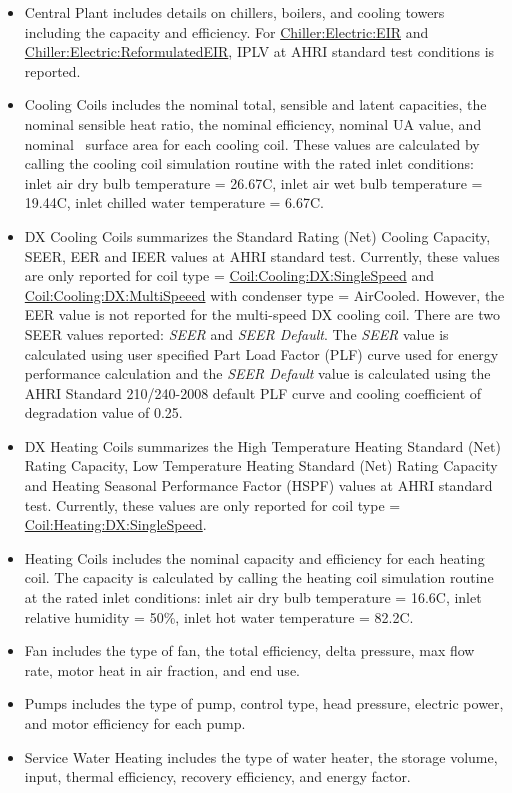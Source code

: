 \begin{itemize}
\item
  Central Plant includes details on chillers, boilers, and cooling towers including the capacity and efficiency. For \hyperref[chillerelectriceir]{Chiller:Electric:EIR} and \hyperref[chillerelectricreformulatedeir]{Chiller:Electric:ReformulatedEIR}, IPLV at AHRI standard test conditions is reported.
\item
  Cooling Coils includes the nominal total, sensible and latent capacities, the nominal sensible heat ratio, the nominal efficiency, nominal UA value, and nominal~ surface area for each cooling coil. These values are calculated by calling the cooling coil simulation routine with the rated inlet conditions: inlet air dry bulb temperature = 26.67C, inlet air wet bulb temperature = 19.44C, inlet chilled water temperature = 6.67C.
\item
  DX Cooling Coils summarizes the Standard Rating (Net) Cooling Capacity, SEER, EER and IEER values at AHRI standard test. Currently, these values are only reported for coil type = \hyperref[coilcoolingdxsinglespeed]{Coil:Cooling:DX:SingleSpeed} and \hyperref[coilcoolingdxmultispeed]{Coil:Cooling:DX:MultiSpeeed} with condenser type = AirCooled. However, the EER value is not reported for the multi-speed DX cooling coil. There are two SEER values reported: \textit{SEER} and \textit{SEER Default}. The \textit{SEER} value is calculated using user specified Part Load Factor (PLF) curve used for energy performance calculation and the \textit{SEER Default} value is calculated using the AHRI Standard 210/240-2008 default PLF curve and cooling coefficient of degradation value of 0.25. 
  \item
  DX Heating Coils summarizes the High Temperature Heating Standard (Net) Rating Capacity, Low Temperature Heating Standard (Net) Rating Capacity and Heating Seasonal Performance Factor (HSPF) values at AHRI standard test. Currently, these values are only reported for coil type = \hyperref[coilheatingdxsinglespeed]{Coil:Heating:DX:SingleSpeed}.
\item
  Heating Coils includes the nominal capacity and efficiency for each heating coil. The capacity is calculated by calling the heating coil simulation routine at the rated inlet conditions: inlet air dry bulb temperature = 16.6C, inlet relative humidity = 50\%, inlet hot water temperature = 82.2C.
\item
  Fan includes the type of fan, the total efficiency, delta pressure, max flow rate, motor heat in air fraction, and end use.
\item
  Pumps includes the type of pump, control type, head pressure, electric power, and motor efficiency for each pump.
\item
  Service Water Heating includes the type of water heater, the storage volume, input, thermal efficiency, recovery efficiency, and energy factor.
\end{itemize}

